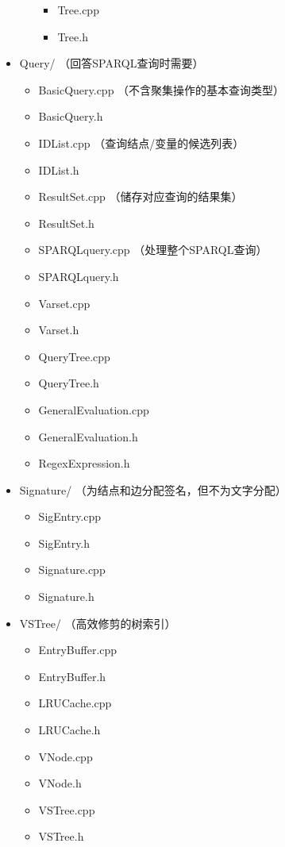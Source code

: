 \documentclass[titlepage, a4paper, 12pt]{article}
\begin{document}
\begin{itemize}
\begin{itemize}
		\begin{itemize}
			\item
			Tree.cpp
			\item
			Tree.h
		\end{itemize}
	\end{itemize}
	\item
	Query/ （回答SPARQL查询时需要）
	
	\begin{itemize}
		\item
		BasicQuery.cpp （不含聚集操作的基本查询类型）
		\item
		BasicQuery.h
		\item
		IDList.cpp （查询结点/变量的候选列表）
		\item
		IDList.h
		\item
		ResultSet.cpp （储存对应查询的结果集）
		\item
		ResultSet.h
		\item
		SPARQLquery.cpp （处理整个SPARQL查询）
		\item
		SPARQLquery.h
		\item
		Varset.cpp
		\item
		Varset.h
		\item
		QueryTree.cpp
		\item
		QueryTree.h
		\item
		GeneralEvaluation.cpp
		\item
		GeneralEvaluation.h
		\item
		RegexExpression.h
	\end{itemize}
	\item
	Signature/ （为结点和边分配签名，但不为文字分配）
	
	\begin{itemize}
		\item
		SigEntry.cpp
		\item
		SigEntry.h
		\item
		Signature.cpp
		\item
		Signature.h
	\end{itemize}
	\item
	VSTree/ （高效修剪的树索引）
	
	\begin{itemize}
		\item
		EntryBuffer.cpp
		\item
		EntryBuffer.h
		\item
		LRUCache.cpp
		\item
		LRUCache.h
		\item
		VNode.cpp
		\item
		VNode.h
		\item
		VSTree.cpp
		\item
		VSTree.h
	\end{itemize}
\end{itemize}
\end{document}
